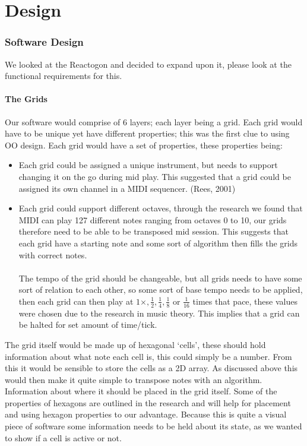 \documentclass[10pt,a4paper]{article}
\begin{document}
\part{Design}
\section{Software Design}
We looked at the Reactogon and decided to expand upon it, please look at the functional requirements for this.
\subsection{The Grids}
Our software would comprise of 6 layers; each layer being a grid. Each grid would have to be unique yet have different properties; this was the first clue to using OO design. Each grid would have a set of properties, these properties being:
\begin{itemize}
\item Each grid could be assigned a unique instrument, but needs to support changing it on the go during mid play. This suggested that a grid could be assigned its own channel in a MIDI sequencer. (Rees, 2001)

\item Each grid could support different octaves, through the research we found that MIDI can play 127 different notes ranging from octaves 0 to 10, our grids therefore need to be able to be transposed mid session. This suggests that each grid have a starting note and some sort of algorithm then fills the grids with correct notes.\\
\\
The tempo of the grid should be changeable, but all grids needs to have some sort of relation to each other, so some sort of base tempo needs to be applied, then each grid can then play at $ 1 \times , \frac{1}{2}, \frac{1}{4}, \frac{1}{8}$ or $\frac{1}{16} $ times that pace, these values were chosen due to the research in music theory. This implies that a grid can be halted for set amount of time/tick.
\end{itemize}

The grid itself would be made up of hexagonal `cells’, these should hold information about what note each cell is, this could simply be a number. From this it would be sensible to store the cells as a 2D array. As discussed above this would then make it quite simple to transpose notes with an algorithm. Information about where it should be placed in the grid itself. Some of the properties of hexagons are outlined in the research and will help for placement and using hexagon properties to our advantage. Because this is quite a visual piece of software some information needs to be held about its state, as we wanted to show if a cell is active or not.
\end{document}

